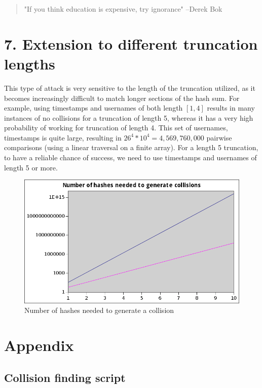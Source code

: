 \documentclass[12pt,letterpaper]{article}
\begin{document}
\begin{verse}
"If you think education is expensive, try ignorance" --Derek Bok 
\end{verse}

\section*{7. Extension to different truncation lengths}
This type of attack is very sensitive to the length of the truncation utilized,
as it becomes increasingly difficult to match longer sections of the hash
sum. For example, using timestamps and usernames of both length $[1,4]$ results
in many instances of no collisions for a truncation of length 5, whereas
it has a very high probability of working for truncation of length 4. This set
of usernames, timestamps is quite large, resulting in
$26^4 * 10^4 = 4,569,760,000$ pairwise comparisons (using a linear traversal
on a finite array). For a length 5 truncation, to have a reliable chance of
success, we need to use timestamps and usernames of length 5 or more.

\begin{figure}[H]
\centering
\includegraphics[width=5in]{complexity.png}
\caption{Number of hashes needed to generate a collision}
\end{figure}

\section*{Appendix}
\subsection{Collision finding script}

\end{document}

